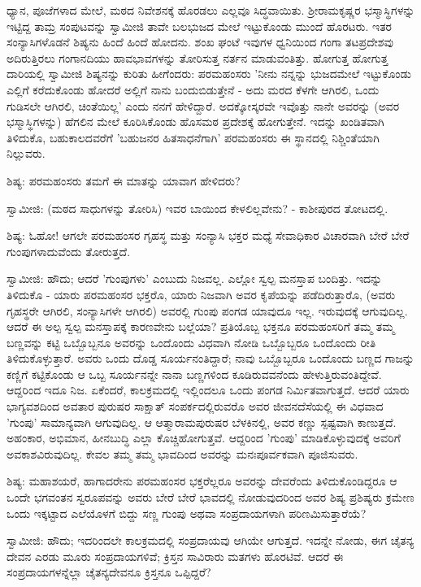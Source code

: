 ಧ್ಯಾನ, ಪೂಜೆಗಳಾದ ಮೇಲೆ, ಮಠದ ನಿವೇಶನಕ್ಕೆ ಹೊರಡಲು ಎಲ್ಲವೂ ಸಿದ್ಧವಾಯಿತು. ಶ‍್ರೀರಾಮಕೃಷ್ಣರ ಭಸ್ಮಾಸ್ಥಿಗಳನ್ನು ಇಟ್ಟಿದ್ದ ತಾಮ್ರ ಸಂಪುಟವನ್ನು ಸ್ವಾಮೀಜಿ ತಾವೇ ಬಲಭುಜದ ಮೇಲೆ ಇಟ್ಟುಕೊಂಡು ಮುಂದೆ ಹೊರಟರು. ಇತರ ಸಂನ್ಯಾಸಿಗಳೊಡನೆ ಶಿಷ್ಯನು ಹಿಂದೆ ಹಿಂದೆ ಹೋದನು. ಶಂಖ ಘಂಟೆ ಇವುಗಳ ಧ್ವನಿಯಿಂದ ಗಂಗಾ ತಟಪ್ರದೇಶವು ಅದಿರುತ್ತಿರಲು ಗಂಗಾನದಿಯು ಹಾವಭಾವಗಳನ್ನು ತೋರಿಸುತ್ತ ನರ್ತನ ಮಾಡುವಂತಿತ್ತು. ಹೋಗುತ್ತ ಹೋಗುತ್ತ ದಾರಿಯಲ್ಲಿ ಸ್ವಾಮೀಜಿ ಶಿಷ್ಯನನ್ನು ಕುರಿತು ಹೀಗೆಂದರು: ಪರಮಹಂಸರು 'ನೀನು ನನ್ನನ್ನು ಭುಜದಮೇಲೆ ಇಟ್ಟುಕೊಂಡು ಎಲ್ಲಿಗೆ ಕರೆದುಕೊಂಡು ಹೋದರೆ ಅಲ್ಲಿಗೆ ನಾನು ಬಂದುಬಿಡುತ್ತೇನೆ - ಅದು ಮರದ ಕೆಳಗೇ ಆಗಿರಲಿ, ಒಂದು ಗುಡಿಸಲೇ ಆಗಿರಲಿ, ಚಿಂತೆಯಿಲ್ಲ' ಎಂದು ನನಗೆ ಹೇಳಿದ್ದಾರೆ. ಅದಕ್ಕೋಸ್ಕರವೇ ಇವೊತ್ತು ನಾನೇ ಅವರನ್ನು (ಅವರ ಭಸ್ಮಾಸ್ಥಿಗಳನ್ನು) ಹೆಗಲಿನ ಮೇಲೆ ಕೂರಿಸಿಕೊಂಡು ಹೊಸಮಠ ಪ್ರದೇಶಕ್ಕೆ ಹೋಗುತ್ತೇನೆ. ಇದನ್ನು ಖಂಡಿತವಾಗಿ ತಿಳಿದುಕೊ, ಬಹುಕಾಲದವರೆಗೆ 'ಬಹುಜನರ ಹಿತಸಾಧನೆಗಾಗಿ' ಪರಮಹಂಸರು ಈ ಸ್ಥಾನದಲ್ಲಿ ನಿಶ್ಚಿಂತೆಯಾಗಿ ನಿಲ್ಲುವರು.

ಶಿಷ್ಯ: ಪರಮಹಂಸರು ತಮಗೆ ಈ ಮಾತನ್ನು ಯಾವಾಗ ಹೇಳಿದರು?

ಸ್ವಾಮೀಜಿ: (ಮಠದ ಸಾಧುಗಳನ್ನು ತೋರಿಸಿ) ಇವರ ಬಾಯಿಂದ ಕೇಳಲಿಲ್ಲವೇನು? - ಕಾಶೀಪುರದ ತೋಟದಲ್ಲಿ.

ಶಿಷ್ಯ: ಓಹೋ! ಆಗಲೇ ಪರಮಹಂಸರ ಗೃಹಸ್ಥ ಮತ್ತು ಸಂನ್ಯಾಸಿ ಭಕ್ತರ ಮಧ್ಯೆ ಸೇವಾಧಿಕಾರ ವಿಚಾರವಾಗಿ ಬೇರೆ ಬೇರೆ ಗುಂಪುಗಳಾದುವೆಂದು ತೋರುತ್ತದೆ.

ಸ್ವಾಮೀಜಿ: ಹೌದು; ಆದರೆ 'ಗುಂಪುಗಳು' ಎಂಬುದು ನಿಜವಲ್ಲ. ಎಲ್ಲೋ ಸ್ವಲ್ಪ ಮನಸ್ತಾಪ ಬಂದಿತ್ತು. ಇದನ್ನು ತಿಳಿದುಕೊ - ಯಾರು ಪರಮಹಂಸರ ಭಕ್ತರೊ, ಯಾರು ನಿಜವಾಗಿ ಅವರ ಕೃಪೆಯನ್ನು ಪಡೆದಿರುತ್ತಾರೊ, (ಅವರು ಗೃಹಸ್ಥರೇ ಆಗಿರಲಿ, ಸಂನ್ಯಾಸಿಗಳೇ ಆಗಿರಲಿ) ಅವರಲ್ಲಿ ಗುಂಪು ಪಂಗಡ ಯಾವುದೂ ಇಲ್ಲ. ಇರುವುದಕ್ಕೆ ಆಗುವುದಿಲ್ಲ. ಆದರೆ ಈ ಅಲ್ಪ ಸ್ವಲ್ಪ ಮನಸ್ತಾಪಕ್ಕೆ ಕಾರಣವೇನು ಬಲ್ಲೆಯಾ? ಪ್ರತಿಯೊಬ್ಬ ಭಕ್ತನೂ ಪರಮಹಂಸರಿಗೆ ತಮ್ಮ ತಮ್ಮ ಬಣ್ಣವನ್ನು ಕಟ್ಟಿ ಒಬ್ಬೊಬ್ಬನೂ ಅವರನ್ನು ಒಂದೊಂದು ವಿಧವಾಗಿ ನೋಡಿ ಒಬ್ಬೊಬ್ಬರೂ ಒಂದೊಂದು ರೀತಿ ತಿಳಿದುಕೊಳ್ಳುತ್ತಾರೆ. ಅವರು ಒಂದು ದೊಡ್ಡ ಸೂರ್ಯನಂತಿದ್ದಾರೆ; ನಾವು ಒಬ್ಬೊಬ್ಬರೂ ಒಂದೊಂದು ಬಣ್ಣದ ಗಾಜನ್ನು ಕಣ್ಣಿಗೆ ಕಟ್ಟಿಕೊಂಡು ಆ ಒಬ್ಬ ಸೂರ್ಯನನ್ನೇ ನಾನಾ ಬಣ್ಣಗಳಿಂದ ಕೂಡಿರುವವನೆಂದು ಹೇಳುತ್ತಿರುವಂತಿದ್ದೇವೆ. ಆದ್ದರಿಂದ ಇದೂ ನಿಜ. ಏಕೆಂದರೆ, ಕಾಲಕ್ರಮದಲ್ಲಿ ಇಲ್ಲಿಂದಲೂ ಒಂದು ಪಂಗಡ ನಿರ್ಮಿತವಾಗುತ್ತದೆ. ಆದರೆ ಯಾರು ಭಾಗ್ಯವಶದಿಂದ ಅವತಾರ ಪುರುಷರ ಸಾಕ್ಷಾತ್ ಸಂಪರ್ಕದಲ್ಲಿರುವರೊ ಅವರ ಜೀವನದೆಸೆಯಲ್ಲಿ ಈ ವಿಧವಾದ 'ಗುಂಪು' ಸಾಮಾನ್ಯವಾಗಿ ಆಗುವುದಿಲ್ಲ. ಆ ಆತ್ಮಾರಾಮಪುರುಷರ ಬೆಳಕಿನಲ್ಲಿ, ಅವರ ಕಣ್ಣು ಸ್ಪಷ್ಟವಾಗಿ ಕಾಣುತ್ತದೆ. ಅಹಂಕಾರ, ಅಭಿಮಾನ, ಹೀನಬುದ್ಧಿ ಎಲ್ಲಾ ಕೊಚ್ಚಿಹೋಗುತ್ತವೆ. ಆದ್ದರಿಂದ 'ಗುಂಪು' ಮಾಡಿಕೊಳ್ಳುವುದಕ್ಕೆ ಅವರಿಗೆ ಅವಕಾಶವಿರುವುದಿಲ್ಲ. ಕೇವಲ ತಮ್ಮ ತಮ್ಮ ಭಾವದಿಂದ ಅವರನ್ನು ಮನಃಪೂರ್ವಕವಾಗಿ ಪೂಜಿಸುವರು.

ಶಿಷ್ಯ: ಮಹಾಶಯರೆ, ಹಾಗಾದರೇನು ಪರಮಹಂಸರ ಭಕ್ತರೆಲ್ಲರೂ ಅವರನ್ನು ದೇವರೆಂದು ತಿಳಿದುಕೊಂಡಿದ್ದರೂ ಆ ಒಂದೇ ಭಗವಂತನ ಸ್ವರೂಪವನ್ನು ಅವರು ಬೇರೆ ಬೇರೆ ಭಾವದಲ್ಲಿ ನೋಡುವುದರಿಂದ ಅವರ ಶಿಷ್ಯ ಪ್ರಶಿಷ್ಯರು ಕ್ರಮೇಣ ಒಂದು ಇಕ್ಕಟ್ಟಾದ ಎಲೆಯೊಳಗೆ ಬಿದ್ದು ಸಣ್ಣ ಗುಂಪು ಅಥವಾ ಸಂಪ್ರದಾಯಗಳಾಗಿ ಪರಿಣಮಿಸುತ್ತಾರೆಯೆ?

ಸ್ವಾಮೀಜಿ: ಹೌದು; ಇದರಿಂದಲೇ ಕಾಲಕ್ರಮದಲ್ಲಿ ಸಂಪ್ರದಾಯವು ಆಗಿಯೇ ಆಗುತ್ತದೆ. ಇದನ್ನೇ ನೋಡು, ಈಗ ಚೈತನ್ಯ ದೇವನ ಎರಡು ಮೂರು ಸಂಪ್ರದಾಯಗಳಿವೆ; ಕ್ರಿಸ್ತನ ಸಾವಿರಾರು ಮತಗಳು ಹೊರಟಿವೆ. ಆದರೆ ಈ ಸಂಪ್ರದಾಯಗಳನ್ನೆಲ್ಲಾ ಚೈತನ್ಯದೇವನೂ ಕ್ರಿಸ್ತನೂ ಒಪ್ಪಿದ್ದರೆ?


